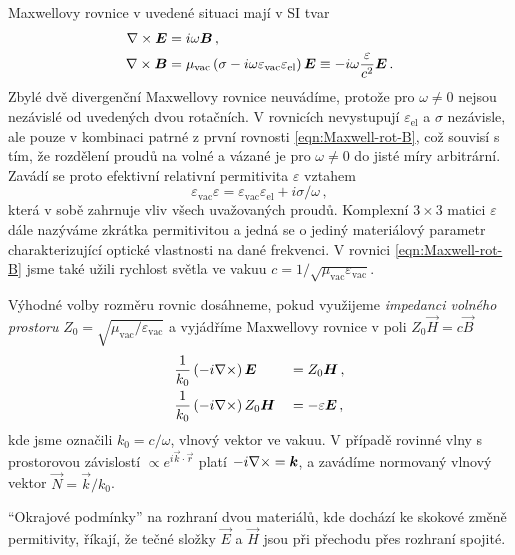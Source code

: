 Maxwellovy rovnice v uvedené situaci mají v SI tvar
\begin{align}
    \nabla\times \bm{E}&=i\omega\bm{B} \,, \label{eqn:Maxwell-rot-E} \\
    \nabla\times \bm{B}&=\mu_{\textrm{vac}} \left( \sigma - i\omega \varepsilon_{\textrm{vac}}\varepsilon_{\textrm{el}} \right) \bm{E} 
        \equiv -i\omega\frac{\varepsilon}{c^2} \bm{E} \,. \label{eqn:Maxwell-rot-B}
\end{align}
Zbylé dvě divergenční Maxwellovy rovnice neuvádíme, protože pro $\omega\neq 0$ nejsou nezávislé od uvedených dvou rotačních.
V rovnicích nevystupují $\varepsilon_{\textrm{el}}$ a $\sigma$ nezávisle, ale pouze v kombinaci patrné z první rovnosti \eqref{eqn:Maxwell-rot-B}, což souvisí s tím, že rozdělení proudů na volné a vázané je pro $\omega\neq 0$ do jisté míry arbitrární.
Zavádí se proto efektivní relativní permitivita $\varepsilon$ vztahem
\begin{equation}
    \varepsilon_{\textrm{vac}} \varepsilon=\varepsilon_{\textrm{vac}} \varepsilon_{\textrm{el}}+i\sigma/\omega \,,
\end{equation}
která v sobě zahrnuje vliv všech uvažovaných proudů.
Komplexní $3\times 3$ matici $\varepsilon$ dále nazýváme zkrátka permitivitou a jedná se o jediný materiálový parametr charakterizující optické vlastnosti na dané frekvenci.
V rovnici \eqref{eqn:Maxwell-rot-B} jsme také užili rychlost světla ve vakuu $c=1/\sqrt{\mu_{\textrm{vac}}\varepsilon_{\textrm{vac}}}$.

Výhodné volby rozměru rovnic dosáhneme, pokud využijeme \emph{impedanci volného prostoru} $Z_0 = \sqrt{\mu_{\textrm{vac}}/\varepsilon_{\textrm{vac}}}$ a vyjádříme Maxwellovy rovnice v poli $Z_0 \vec{H}=c \vec{B}$
\begin{alignat}{2}
    & \frac{1}{k_0} \left( -i \nabla\times \right) \bm{E} &&= Z_0 \bm{H} \,, \label{eqn:rot-E}\\
    & \frac{1}{k_0} \left( -i \nabla\times \right) Z_0 \bm{H} &&=-\varepsilon \bm{E} \,, \label{eqn:rot-ZH}
\end{alignat}
kde jsme označili $k_0 = c/\omega$, vlnový vektor ve vakuu.
V případě rovinné vlny s prostorovou závislostí $\propto e^{i \vec{k}\cdot \vec{r}}$ platí $-i \nabla\times = \bm{k}$, a zavádíme normovaný vlnový vektor $\vec{N}=\vec{k}/k_0$.

``Okrajové podmínky'' na rozhraní dvou materiálů, kde dochází ke skokové změně permitivity, říkají, že tečné složky $\vec{E}$ a $\vec{H}$ jsou při přechodu přes rozhraní spojité.
